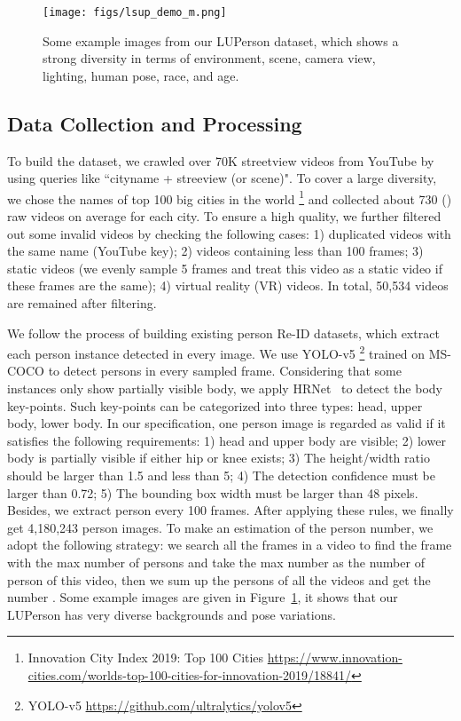 \documentclass[final]{cvpr}
\newcommand{\Fref}[1]{Figure~\ref{#1}}
\begin{document}
\begin{figure}[t]
\begin{center}
    \texttt{[image: figs/lsup\_demo\_m.png]}
\end{center}
\vspace{-1.5em}
   \caption{Some example images from our LUPerson dataset, which shows a strong diversity in terms of environment, scene, camera view, lighting, human pose, race, and age.}
\label{fig:LUPerson-demo}
\end{figure}

\subsection{Data Collection and Processing}
To build the dataset, we crawled over 70K streetview videos from YouTube by using queries like ``cityname + streeview (or scene)". To cover a large diversity, we chose the names of top 100 big cities in the world \footnote{Innovation City Index 2019: Top 100 Cities \url{https://www.innovation-cities.com/worlds-top-100-cities-for-innovation-2019/18841/}} and collected about 730 () raw videos on average for each city. To ensure a high quality, we further filtered out some invalid videos by checking the following cases: 1) duplicated videos with the same name (YouTube key); 2) videos containing less than 100 frames; 3) static videos (we evenly sample 5 frames and treat this video as a static video if these frames are the same); 4) virtual reality (VR) videos. In total, 50,534 videos are remained after filtering.

We follow the process of building existing person Re-ID datasets, which extract each person instance detected in every image. We use YOLO-v5 \footnote{YOLO-v5 \url{https://github.com/ultralytics/yolov5}} trained on MS-COCO to detect persons in every sampled frame. Considering that some instances only show partially visible body, we apply HRNet~\cite{SunXLW19} to detect the body key-points. Such key-points can be categorized into three types: head, upper body, lower body. In our specification, one person image is regarded as valid if it satisfies the following requirements:  1) head and upper body are visible; 2) lower body is partially visible if either hip or knee exists; 3) The height/width ratio should be larger than 1.5 and less than 5; 4) The detection confidence must be larger than 0.72; 5) The bounding box width must be larger than 48 pixels. Besides, we extract person every 100 frames. After applying these rules, we finally get 4,180,243 person images. To make an estimation of the person number, we adopt the following strategy: we search all the frames in a video to find the frame with the max number of persons and take the max number as the number of person of this video, then we sum up the persons of all the videos and get the number . Some example images are given in \Fref{fig:LUPerson-demo}, it shows that our LUPerson has very diverse backgrounds and pose variations. 
\end{document}
